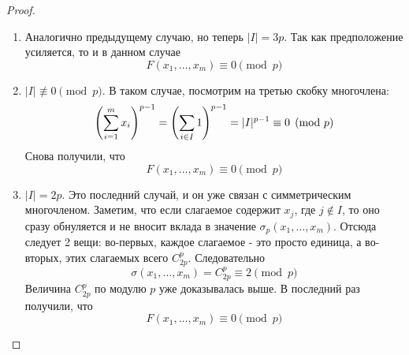 \begin{proof}
\begin{enumerate}
		\item Аналогично предыдущему случаю, но теперь $|I| = 3p$. Так как предположение усиляется, то и в данном случае
		\[
			F(x_1, \ldots, x_m) \equiv 0 \pmod p
		\]
		
		\item $|I| \not\equiv 0 \pmod p$. В таком случае, посмотрим на третью скобку многочлена:
		\[
			\left(\sum\limits_{i = 1}^m x_i\right)^{p - 1} = \left(\sum\limits_{i \in I} 1\right)^{p - 1} = |I|^{p - 1} \equiv 0 \pmod p
		\]
		Снова получили, что
		\[
			F(x_1, \ldots, x_m) \equiv 0 \pmod p
		\]
		
		\item $|I| = 2p$. Это последний случай, и он уже связан с симметрическим многочленом. Заметим, что если слагаемое содержит $x_j$, где $j \notin I$, то оно сразу обнуляется и не вносит вклада в значение $\sigma_p(x_1, \ldots, x_m)$. Отсюда следует 2 вещи: во-первых, каждое слагаемое - это просто единица, а во-вторых, этих слагаемых всего $C_{2p}^p$. Следовательно
		\[
			\sigma(x_1, \ldots, x_m) = C_{2p}^p \equiv 2 \pmod p
		\]
		Величина $C_{2p}^p$ по модулю $p$ уже доказывалась выше. В последний раз получили, что
		\[
			F(x_1, \ldots, x_m) \equiv 0 \pmod p
		\]
		

\end{enumerate}
\end{proof}
